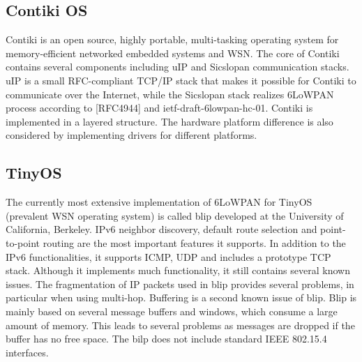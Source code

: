 \documentclass[10pt]{article}
\begin{document}
\subsection{Contiki OS}
Contiki is an open source, highly portable, multi-tasking operating system for memory-efficient networked embedded systems and WSN.  The core of Contiki contains several components including uIP and Sicslopan communication stacks. uIP is a small RFC-compliant TCP/IP stack that makes it possible for Contiki to communicate over the Internet, while the Sicslopan stack realizes 6LoWPAN process according to [RFC4944] and ietf-draft-6lowpan-hc-01.  Contiki is implemented in a layered structure.  The hardware platform difference is also considered by implementing drivers for different platforms.  

\subsection{TinyOS}
The currently most extensive implementation of 6LoWPAN for TinyOS (prevalent WSN operating system) is called blip developed at the University of California, Berkeley.  IPv6 neighbor discovery, default route selection and point-to-point routing are the most important features it supports.  In addition to the IPv6 functionalities, it supports ICMP, UDP and includes a prototype TCP stack.  Although it implements much functionality, it still contains several known issues.  The fragmentation of IP packets used in blip provides several problems, in particular when using multi-hop.  Buffering is a second known issue of blip.  Blip is mainly based on several message buffers and windows, which consume a large amount of memory.  This leads to several problems as messages are dropped if the buffer has no free space.  The bilp does not include standard IEEE 802.15.4 interfaces.  
\end{document}
